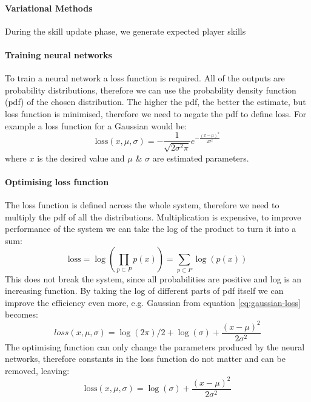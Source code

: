 \documentclass[12pt,a4paper]{book}
\begin{document}
\paragraph{Variational Methods}
During the skill update phase, we generate expected player skills 
\paragraph{Training neural networks}
To train a neural network a loss function is required.
All of the outputs are probability distributions, therefore we can use the probability density function (pdf) of the chosen distribution.
The higher the pdf, the better the estimate, but loss function is minimised, therefore we need to negate the pdf to define loss.
For example a loss function for a Gaussian would be:
\begin{equation}
\text{loss}(x,\mu,\sigma) = -\frac{1}{\sqrt{2\sigma^2\pi}}e^{-\frac{(x-\mu)^2}{2\sigma^2}}
\label{eq:gaussian-loss}
\end{equation}
where $x$ is the desired value and $\mu$ \& $\sigma$ are estimated parameters.

\paragraph{Optimising loss function}
The loss function is defined across the whole system, therefore we need to multiply the pdf of all the distributions.
Multiplication is expensive, to improve performance of the system we can take the log of the product to turn it into a sum:
\begin{equation}
\text{loss} = \log\left(\prod_{p\subset P}p(x)\right) = \sum_{p\subset P}\log(p(x))
\end{equation}
This does not break the system, since all probabilities are positive and log is an increasing function.
By taking the log of different parts of pdf itself we can improve the efficiency even more, e.g. Gaussian from equation \ref{eq:gaussian-loss} becomes:
\begin{equation}
{loss}(x,\mu,\sigma) = \log(2\pi)/2+\log(\sigma)+\frac{(x-\mu)^2}{2\sigma^2}
\end{equation}
The optimising function can only change the parameters produced by the neural networks, therefore constants in the loss function do not matter and can be removed, leaving:
\begin{equation}
\text{loss}(x,\mu,\sigma) = \log(\sigma)+\frac{(x-\mu)^2}{2\sigma^2}
\label{eq:gaussian-log-loss}
\end{equation}
\end{document}
